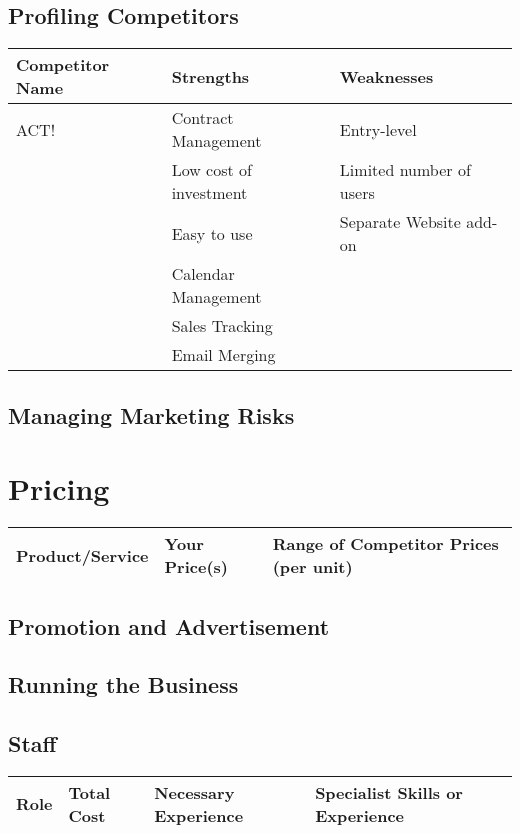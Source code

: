 \documentclass[DIV=calc, paper=a4, fontsize=11pt]{scrartcl}	 %
\begin{document}
\subsection{Profiling Competitors}
\begin{tabular}{|l|p{}|p{}|} \hline
Competitor Name & Strengths & Weaknesses \\ \hline
ACT! & Contract Management    & Entry-level             \\
     & Low cost of investment & Limited number of users \\
     & Easy to use            & Separate Website add-on \\
     & Calendar Management    &  \\
     & Sales Tracking         &  \\
     & Email Merging          &  \\

          

\end{tabular}

\subsection{Managing Marketing Risks}

\section{Pricing}

\begin{tabular}{|l|l|l|} \hline
Product/Service & Your Price(s) & Range of Competitor Prices (per unit) \\ \hline
\end{tabular}

\subsection{Promotion and Advertisement}

\subsection{Running the Business}

\subsection{Staff}
\begin{tabular}{|l|l|l|l|}\hline
Role & Total Cost & Necessary Experience & Specialist Skills or Experience \\ \hline
\end{tabular}
\end{document}
